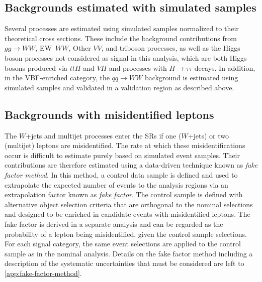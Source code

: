 \subsection{Backgrounds estimated with simulated samples}
Several processes are estimated using simulated samples normalized to their theoretical cross sections.
These include the background contributions from $gg \to WW$, EW~$WW$, Other $VV$, and triboson processes, as well as the Higgs boson processes not considered as signal in this analysis, which are both Higgs bosons produced via $ttH$ and $VH$ and processes with $H\to\tau\tau$ decays. In addition, in the VBF-enriched \TwoJet category, the $qq \to WW$ background is estimated using simulated samples and validated in a validation region as described above.

\subsection{Backgrounds with misidentified leptons}
\label{subsec:misid-bkg}
The $W$+jets and multijet processes enter the SRs if one ($W$+jets) or two (multijet) leptons are misidentified.
The rate at which these misidentifications occur is difficult to estimate purely based on simulated event samples.
Their contributions are therefore estimated using a data-driven technique known as \emph{fake factor method}. In this method, a control data sample is defined and used to extrapolate the expected number of events to the analysis regions via an extrapolation factor known as \emph{fake factor}.
The control sample is defined with alternative object selection criteria that are orthogonal to the nominal selections and designed to be enriched in candidate events with misidentified leptons.
The fake factor is derived in a separate analysis and can be regarded as the probability of a lepton being misidentified, given the control sample selections.
For each signal category, the same event selections are applied to the control sample as in the nominal analysis. Details on the fake factor method including a description of the systematic uncertainties that must be considered are left to \cref{app:fake-factor-method}.



